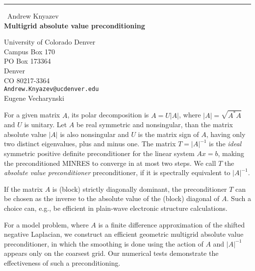 \documentclass{report}
\begin{document}
\begin{center}
\rule{6in}{1pt} \
{\large Andrew Knyazev \\
{\bf Multigrid absolute value preconditioning}}

University of Colorado Denver \\ Campus Box 170 \\ PO Box 173364 \\ Denver \\ CO 80217-3364
\\
{\tt Andrew.Knyazev@ucdenver.edu}\\
Eugene Vecharynski\end{center}

For a given matrix $A$, its polar decomposition is $A=U|A|$, where
$|A|=\sqrt{A^*A}$ and $U$ is unitary. Let $A$ be real symmetric and
nonsingular, than the matrix absolute value $|A|$ is also nonsingular and
$U$ is the matrix sign of $A$, having only two distinct eigenvalues, plus
and minus one. The matrix $T=|A|^{-1}$ is the \emph{ideal} symmetric
positive definite preconditioner for the linear system $Ax=b$, making the
preconditioned MINRES to converge in at most two steps. We call $T$ the
\emph{absolute value preconditioner} preconditioner, if it is spectrally
equivalent to $|A|^{-1}$.

If the matrix $A$ is (block) strictly diagonally dominant, the
preconditioner $T$ can be chosen as the inverse to the absolute value of
the (block) diagonal of $A$. Such a choice can, e.g., be efficient in
plain-wave electronic structure calculations.

For a model problem, where $A$ is a finite difference approximation of
the shifted negative Laplacian, we construct an efficient geometric
multigrid absolute value preconditioner, in which the smoothing is done
using the action of $A$ and $|A|^{-1}$ appears only on the coarsest grid.
Our numerical tests demonstrate the effectiveness of such a
preconditioning.
\end{document}
